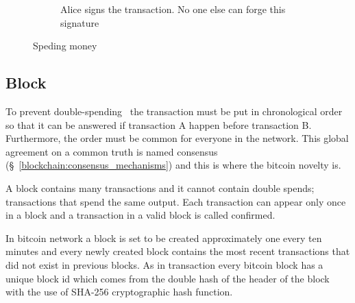 \begin{figure}[ht!]
\begin{subfigure}[t]{0.50\textwidth}
    \caption{Alice signs the transaction. No one else can forge this signature}
    \label{fig:bl_spent:d}
  \end{subfigure}
  \caption{Speding money}
  \label{fig:bl_spent}
\end{figure}

\subsection{Block}\label{blockchain:structure:block}

To prevent double-spending~\cite{wiki:double_spend,bitcoin_wiki:double_spend} the transaction must be put in chronological order so that it can be answered
if transaction A happen before transaction B. Furthermore, the order must be common for everyone in the network.
This global agreement on a common truth is named consensus (§~\ref{blockchain:consensus_mechanisms}) and this is where the bitcoin novelty is.

A block contains many transactions and it cannot contain double spends; transactions that spend the same output.
Each transaction can appear only once in a block and a transaction in a valid block is called confirmed.

In bitcoin network a block is set to be created approximately one every ten minutes and every newly created block contains the most recent transactions that did not
exist in previous blocks. As in transaction every bitcoin block has a unique block id which comes from the double hash of the header of the block with the use of SHA-256 cryptographic hash function.

